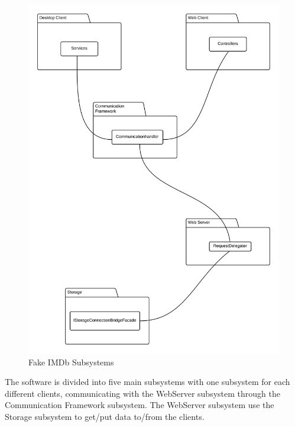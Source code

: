 \begin{figure}[H]
\includegraphics[width=\linewidth]{img/SDD/FakeIMDbSubsytems.png}
\caption{Fake IMDb Subsystems}
\label{fig:FakeIMDBSubsystems}
\end{figure}

The software is divided into five main subsystems with one subsystem for each different clients, communicating with the WebServer subsystem through the Communication Framework subsystem. The WebServer subsystem use the Storage subsystem to get/put data to/from the clients.\\

